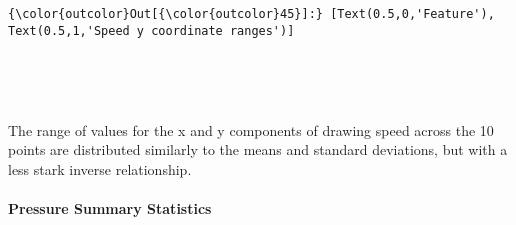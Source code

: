 \documentclass[11pt]{article}
\begin{document}
\begin{Verbatim}[commandchars=\\\{\}]
{\color{outcolor}Out[{\color{outcolor}45}]:} [Text(0.5,0,'Feature'), Text(0.5,1,'Speed y coordinate ranges')]
\end{Verbatim}
            
    \begin{center}
    \end{center}
    { \hspace*{\fill} \\}
    
    \begin{center}
    \end{center}
    { \hspace*{\fill} \\}
    
    The range of values for the x and y components of drawing speed across
the 10 points are distributed similarly to the means and standard
deviations, but with a less stark inverse relationship.

    \hypertarget{pressure-summary-statistics}{%
\paragraph{Pressure Summary
Statistics}\label{pressure-summary-statistics}}
\end{document}
